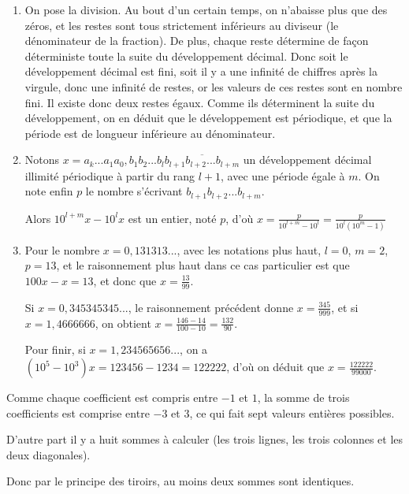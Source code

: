 \begin{Soln}{5}
\begin{enumerate}
\item On pose la division. Au bout d'un certain temps, on n'abaisse plus que des zéros, et les restes sont tous strictement inférieurs au diviseur (le dénominateur de la fraction). De plus, chaque reste détermine de façon déterministe toute la suite du développement décimal. Donc soit le développement décimal est fini, soit il y a une infinité de chiffres après la virgule, donc une infinité de restes, or les valeurs de ces restes sont en nombre fini. Il existe donc deux restes égaux. Comme ils déterminent la suite du développement, on en déduit que le développement est périodique, et que la période est de longueur inférieure au dénominateur.
\item Notons $x=a_k...a_1a_0,b_1b_2...b_l\overline{b_{l+1}b_{l+2}...b_{l+m}}$ un développement décimal illimité périodique à partir du rang $l+1$, avec une période égale à $m$. On note enfin $p$ le nombre s'écrivant $b_{l+1}b_{l+2}...b_{l+m}$.

Alors $10^{l+m}x - 10^lx$ est un entier, noté $p$, d'où $x = \frac{p}{10^{l+m} - 10^l} = \frac{p}{10^l(10^m-1)}$
\item Pour le nombre $x=0,131313...$, avec les notations plus haut, $l=0$, $m=2$, $p=13$, et le raisonnement plus haut dans ce cas particulier est que $100x-x=13$, et donc que $x=\frac{13}{99}$.

Si $x=0,345345345...$, le raisonnement précédent donne $x=\frac{345}{999}$, et si $x=1,4666666$, on obtient $x=\frac{146-14}{100-10}=\frac{132}{90}$.

Pour finir, si $x=1,234565656...$, on a $(10^5-10^3)x=123456-1234=122222$, d'où on déduit que $x=\frac{122222}{99000}$.
\end{enumerate}
\end{Soln}
\begin{Soln}{6}
Comme chaque coefficient est compris entre $-1$ et $1$, la somme de trois coefficients est comprise entre $-3$ et $3$, ce qui fait sept valeurs entières possibles.

D'autre part il y a huit sommes à calculer (les trois lignes, les trois colonnes et les deux diagonales).

Donc par le principe des tiroirs, au moins deux sommes sont identiques.
\end{Soln}
